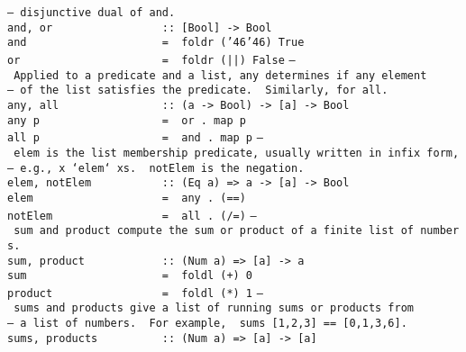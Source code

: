 \mbox{\tt --\ disjunctive\ dual\ of\ and.}\\
\mbox{\tt and,\ or\ \ \ \ \ \ \ \ \ \ \ \ \ \ \ \ \ ::\ [Bool]\ ->\ Bool}\\
\mbox{\tt and\ \ \ \ \ \ \ \ \ \ \ \ \ \ \ \ \ \ \ \ \ =\ \ foldr\ ({\char'46}{\char'46})\ True}\\
\mbox{\tt or\ \ \ \ \ \ \ \ \ \ \ \ \ \ \ \ \ \ \ \ \ \ =\ \ foldr\ (||)\ False}
%
%
\eprogB\noindent\bprogB
\mbox{\tt --\ Applied\ to\ a\ predicate\ and\ a\ list,\ any\ determines\ if\ any\ element}\\
\mbox{\tt --\ of\ the\ list\ satisfies\ the\ predicate.\ \ Similarly,\ for\ all.}\\
\mbox{\tt any,\ all\ \ \ \ \ \ \ \ \ \ \ \ \ \ \ \ ::\ (a\ ->\ Bool)\ ->\ [a]\ ->\ Bool}\\
\mbox{\tt any\ p\ \ \ \ \ \ \ \ \ \ \ \ \ \ \ \ \ \ \ =\ \ or\ .\ map\ p}\\
\mbox{\tt all\ p\ \ \ \ \ \ \ \ \ \ \ \ \ \ \ \ \ \ \ =\ \ and\ .\ map\ p}
%
%
\eprogB\noindent\bprogB
\mbox{\tt --\ elem\ is\ the\ list\ membership\ predicate,\ usually\ written\ in\ infix\ form,}\\
\mbox{\tt --\ e.g.,\ x\ `elem`\ xs.\ \ notElem\ is\ the\ negation.}\\
\mbox{\tt elem,\ notElem\ \ \ \ \ \ \ \ \ \ \ ::\ (Eq\ a)\ =>\ a\ ->\ [a]\ ->\ Bool}\\
\mbox{\tt elem\ \ \ \ \ \ \ \ \ \ \ \ \ \ \ \ \ \ \ \ =\ \ any\ .\ (==)}\\
\mbox{\tt notElem\ \ \ \ \ \ \ \ \ \ \ \ \ \ \ \ \ =\ \ all\ .\ (/=)}
%
%
\eprogB\noindent\bprogB
\mbox{\tt --\ sum\ and\ product\ compute\ the\ sum\ or\ product\ of\ a\ finite\ list\ of\ numbers.}\\
\mbox{\tt sum,\ product\ \ \ \ \ \ \ \ \ \ \ \ ::\ (Num\ a)\ =>\ [a]\ ->\ a}\\
\mbox{\tt sum\ \ \ \ \ \ \ \ \ \ \ \ \ \ \ \ \ \ \ \ \ =\ \ foldl\ (+)\ 0\ \ }\\
\mbox{\tt product\ \ \ \ \ \ \ \ \ \ \ \ \ \ \ \ \ =\ \ foldl\ (*)\ 1}
%
%
\eprogB\noindent\bprogB
\mbox{\tt --\ sums\ and\ products\ give\ a\ list\ of\ running\ sums\ or\ products\ from}\\
\mbox{\tt --\ a\ list\ of\ numbers.\ \ For\ example,\ \ sums\ [1,2,3]\ ==\ [0,1,3,6].}\\
\mbox{\tt sums,\ products\ \ \ \ \ \ \ \ \ \ ::\ (Num\ a)\ =>\ [a]\ ->\ [a]}\\
